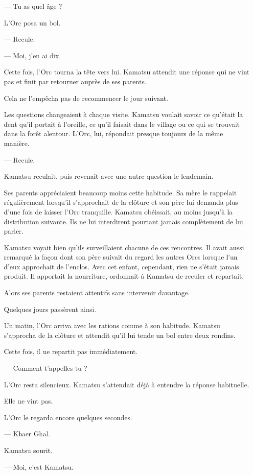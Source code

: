 — Tu as quel âge ?

L'Orc posa un bol.

— Recule.

— Moi, j'en ai dix.

Cette fois, l'Orc tourna la tête vers lui. Kamatsu attendit une réponse qui ne
vint pas et finit par retourner auprès de ses parents.

Cela ne l'empêcha pas de recommencer le jour suivant.

Les questions changeaient à chaque visite. Kamatsu voulait savoir ce qu'était
la dent qu'il portait à l'oreille, ce qu'il faisait dans le village ou ce qui
se trouvait dans la forêt alentour. L'Orc, lui, répondait presque toujours de
la même manière.

— Recule.

Kamatsu reculait, puis revenait avec une autre question le lendemain.

Ses parents appréciaient beaucoup moins cette habitude. Sa mère le rappelait
régulièrement lorsqu'il s'approchait de la clôture et son père lui demanda plus
d'une fois de laisser l'Orc tranquille. Kamatsu obéissait, au moins jusqu'à la
distribution suivante. Ils ne lui interdirent pourtant jamais complètement de
lui parler.

Kamatsu voyait bien qu'ils surveillaient chacune de ces rencontres. Il avait
aussi remarqué la façon dont son père suivait du regard les autres Orcs lorsque
l'un d'eux approchait de l'enclos. Avec cet enfant, cependant, rien ne s'était
jamais produit. Il apportait la nourriture, ordonnait à Kamatsu de reculer et
repartait.

Alors ses parents restaient attentifs sans intervenir davantage.

Quelques jours passèrent ainsi.

Un matin, l'Orc arriva avec les rations comme à son habitude. Kamatsu
s'approcha de la clôture et attendit qu'il lui tende un bol entre deux rondins.

Cette fois, il ne repartit pas immédiatement.

— Comment t'appelles-tu ?

L'Orc resta silencieux. Kamatsu s'attendait déjà à entendre la réponse
habituelle.

Elle ne vint pas.

L'Orc le regarda encore quelques secondes.

— Khaer Ghal.

Kamatsu sourit.

— Moi, c'est Kamatsu.

